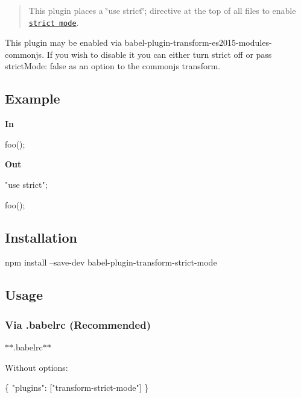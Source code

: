\begin{quote}
This plugin places a {\ttfamily \char`\"{}use strict\char`\"{};} directive at the top of all files to enable \href{https://developer.mozilla.org/en-US/docs/Web/JavaScript/Reference/Strict_mode}{\tt strict mode}. \end{quote}


This plugin may be enabled via {\ttfamily babel-\/plugin-\/transform-\/es2015-\/modules-\/commonjs}. If you wish to disable it you can either turn {\ttfamily strict} off or pass {\ttfamily strict\+Mode\+: false} as an option to the commonjs transform.

\subsection*{Example}

{\bfseries In}


\begin{DoxyCode}
foo();
\end{DoxyCode}


{\bfseries Out}


\begin{DoxyCode}
"use strict";

foo();
\end{DoxyCode}


\subsection*{Installation}


\begin{DoxyCode}
npm install --save-dev babel-plugin-transform-strict-mode
\end{DoxyCode}


\subsection*{Usage}

\subsubsection*{Via {\ttfamily .babelrc} (Recommended)}

$\ast$$\ast$.babelrc$\ast$$\ast$

Without options\+:


\begin{DoxyCode}
\{
  "plugins": ["transform-strict-mode"]
\}
\end{DoxyCode}


